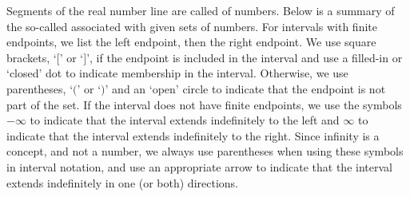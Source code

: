 \medskip


\medskip

 Segments of the real number line are called  of numbers. Below is a summary of the so-called  associated with given sets of numbers.  For intervals with finite endpoints, we list the left endpoint, then the right endpoint.  We use square brackets, `$[$' or `$]$', if the endpoint is included in the interval and use a filled-in or `closed' dot to indicate membership in the interval. Otherwise, we use parentheses, `$($' or `$)$' and an `open' circle to indicate that the endpoint is not part of the set.  If the interval does not have finite endpoints, we use the symbols $-\infty$ to indicate that the interval extends indefinitely to the left and $\infty$ to indicate that the interval extends indefinitely to the right.  Since infinity is a concept, and not a number, we always use parentheses when using these symbols in interval notation, and use an appropriate arrow to indicate that the interval extends indefinitely in one (or both) directions.

